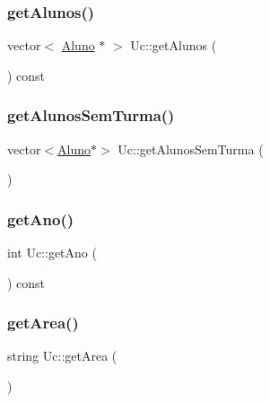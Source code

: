 \hypertarget{class_uc_aed4df59cb5431e64486d6ac45efad4fc}{}\label{class_uc_aed4df59cb5431e64486d6ac45efad4fc} 
\subsubsection{\texorpdfstring{get\+Alunos()}{getAlunos()}}
{\footnotesize\ttfamily vector$<$ \hyperlink{class_aluno}{Aluno} $\ast$ $>$ Uc\+::get\+Alunos (\begin{DoxyParamCaption}{ }\end{DoxyParamCaption}) const}

\hypertarget{class_uc_a2b4ec2b2eee6d846de5553d02f75e062}{}\label{class_uc_a2b4ec2b2eee6d846de5553d02f75e062} 
\subsubsection{\texorpdfstring{get\+Alunos\+Sem\+Turma()}{getAlunosSemTurma()}}
{\footnotesize\ttfamily vector$<$\hyperlink{class_aluno}{Aluno}$\ast$$>$ Uc\+::get\+Alunos\+Sem\+Turma (\begin{DoxyParamCaption}{ }\end{DoxyParamCaption})}

\hypertarget{class_uc_a8208b7eed44e19a08d92442ad8202dd0}{}\label{class_uc_a8208b7eed44e19a08d92442ad8202dd0} 
\subsubsection{\texorpdfstring{get\+Ano()}{getAno()}}
{\footnotesize\ttfamily int Uc\+::get\+Ano (\begin{DoxyParamCaption}{ }\end{DoxyParamCaption}) const}

\hypertarget{class_uc_a98e8e68278a1cfb628662ab3d613410f}{}\label{class_uc_a98e8e68278a1cfb628662ab3d613410f} 
\subsubsection{\texorpdfstring{get\+Area()}{getArea()}}
{\footnotesize\ttfamily string Uc\+::get\+Area (\begin{DoxyParamCaption}{ }\end{DoxyParamCaption})\hspace{0.3cm}{\ttfamily [virtual]}}



